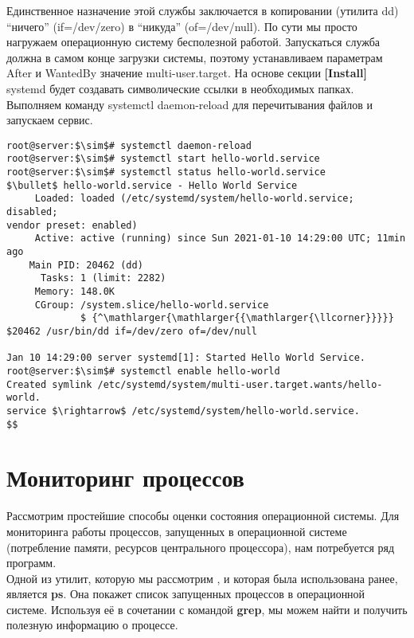 \documentclass[14pt, a4paper]{article}
\begin{document}
Единственное назначение этой службы заключается в копировании (утилита \colorbox{backcolour}{dd}) “ничего”
(\colorbox{backcolour}{if=/dev/zero}) в “никуда” (\colorbox{backcolour}{of=/dev/null}). По сути мы просто нагружаем операционную систему
бесполезной работой. Запускаться служба должна в самом конце загрузки системы, поэтому
устанавливаем параметрам \colorbox{backcolour}{After} и \colorbox{backcolour}{WantedBy} значение \colorbox{backcolour}{multi-user.target}. На основе секции
\textbf{[Install]} systemd будет создавать символические ссылки в необходимых папках.\\

Выполняем команду \colorbox{backcolour}{systemctl daemon-reload} для перечитывания файлов и запускаем сервис.
\vspace{0.3cm}

\begin{lstlisting}
root@server:$\sim$# systemctl daemon-reload
root@server:$\sim$# systemctl start hello-world.service
root@server:$\sim$# systemctl status hello-world.service
$\bullet$ hello-world.service - Hello World Service
     Loaded: loaded (/etc/systemd/system/hello-world.service; disabled; 
vendor preset: enabled)
     Active: active (running) since Sun 2021-01-10 14:29:00 UTC; 11min ago
    Main PID: 20462 (dd)
      Tasks: 1 (limit: 2282)
     Memory: 148.0K
     CGroup: /system.slice/hello-world.service
             $ {^\mathlarger{\mathlarger{{\mathlarger{\llcorner}}}}} $20462 /usr/bin/dd if=/dev/zero of=/dev/null

Jan 10 14:29:00 server systemd[1]: Started Hello World Service.
root@server:$\sim$# systemctl enable hello-world
Created symlink /etc/systemd/system/multi-user.target.wants/hello-world.
service $\rightarrow$ /etc/systemd/system/hello-world.service.
$$
\end{lstlisting}

\newpage

\section*{Мониторинг процессов} 

Рассмотрим простейшие способы оценки состояния операционной системы. Для мониторинга работы
процессов, запущенных в операционной системе (потребление памяти, ресурсов центрального
процессора), нам потребуется ряд программ.\\

Одной из утилит, которую мы рассмотрим , и которая была использована ранее, является \textbf{ps}. Она
покажет список запущенных процессов в операционной системе. Используя её в сочетании с
командой \textbf{grep}, мы можем найти и получить полезную информацию о процессе.
\end{document}
